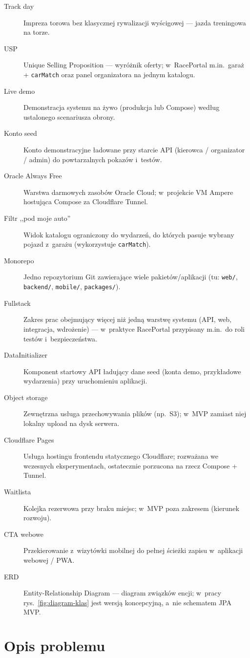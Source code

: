 \documentclass{sprz}
\begin{document}
\begin{description}
  \item[Track day] Impreza torowa bez klasycznej rywalizacji wyścigowej --- jazda treningowa na torze.
  \item[USP] Unique Selling Proposition --- wyróżnik oferty; w~RacePortal m.in.\ garaż + \texttt{carMatch} oraz panel organizatora na jednym katalogu.
  \item[Live demo] Demonstracja systemu na żywo (produkcja lub Compose) według ustalonego scenariusza obrony.
  \item[Konto seed] Konto demonstracyjne ładowane przy starcie API (kierowca / organizator / admin) do powtarzalnych pokazów i~testów.
  \item[Oracle Always Free] Warstwa darmowych zasobów Oracle Cloud; w~projekcie VM Ampere hostująca Compose za Cloudflare Tunnel.
  \item[Filtr ,,pod moje auto''] Widok katalogu ograniczony do wydarzeń, do których pasuje wybrany pojazd z~garażu (wykorzystuje \texttt{carMatch}).
  \item[Monorepo] Jedno repozytorium Git zawierające wiele pakietów/aplikacji (tu: \texttt{web/}, \texttt{backend/}, \texttt{mobile/}, \texttt{packages/}).
  \item[Fullstack] Zakres prac obejmujący więcej niż jedną warstwę systemu (API, web, integracja, wdrożenie) --- w~praktyce RacePortal przypisany m.in.\ do roli testów i~bezpieczeństwa.
  \item[DataInitializer] Komponent startowy API ładujący dane seed (konta demo, przykładowe wydarzenia) przy uruchomieniu aplikacji.
  \item[Object storage] Zewnętrzna usługa przechowywania plików (np.\ S3); w~MVP zamiast niej lokalny upload na dysk serwera.
  \item[Cloudflare Pages] Usługa hostingu frontendu statycznego Cloudflare; rozważana we wczesnych eksperymentach, ostatecznie porzucona na rzecz Compose + Tunnel.
  \item[Waitlista] Kolejka rezerwowa przy braku miejsc; w~MVP poza zakresem (kierunek rozwoju).
  \item[CTA webowe] Przekierowanie z~wizytówki mobilnej do pełnej ścieżki zapisu w~aplikacji webowej / PWA.
  \item[ERD] Entity-Relationship Diagram --- diagram związków encji; w~pracy rys.~\ref{fig:diagram-klas} jest wersją koncepcyjną, a~nie schematem JPA MVP.
\end{description}

\chapter{Opis problemu}
\end{document}
